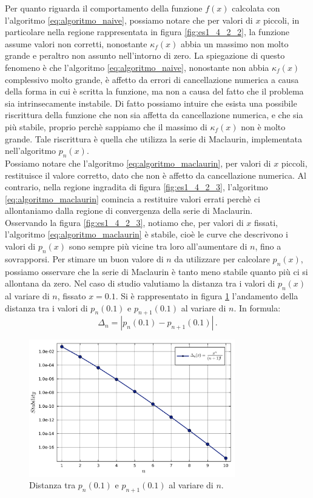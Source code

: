 \documentclass[letterpaper, 12pt]{article}
\begin{document}
Per quanto riguarda il comportamento della funzione $f(x)$ calcolata con l'algoritmo \ref{eq:algoritmo_naive},
possiamo notare che per valori di $x$ piccoli, in particolare nella regione rappresentata in figura 
\ref{fig:es1_4_2_2}, la funzione assume valori non corretti, nonostante $\kappa_f(x)$ abbia un massimo non molto
grande e peraltro non assunto nell'intorno di zero. La spiegazione di questo fenomeno è che l'algoritmo
\ref{eq:algoritmo_naive}, nonostante non abbia $\kappa_f(x)$ complessivo molto grande, è affetto da errori 
di cancellazione numerica a causa della forma in cui è scritta la funzione, ma non a causa del fatto che 
il problema sia intrinsecamente instabile. Di fatto possiamo intuire che esista una possibile riscrittura
della funzione che non sia affetta da cancellazione numerica, e che sia più stabile, proprio perchè 
sappiamo che il massimo di $\kappa_f(x)$ non è molto grande. Tale riscrittura è quella che utilizza la
serie di Maclaurin, implementata nell'algoritmo $p_n(x)$. \\
Possiamo notare che l'algoritmo \ref{eq:algoritmo_maclaurin}, per valori di $x$ piccoli, restituisce il 
valore corretto, dato che non è affetto da cancellazione numerica. Al contrario, nella regione ingradita di 
figura \ref{fig:es1_4_2_3}, l'algoritmo \ref{eq:algoritmo_maclaurin} comincia a restituire valori errati
perchè ci allontaniamo dalla regione di convergenza della serie di Maclaurin. \\
Osservando la figura \ref{fig:es1_4_2_3}, notiamo che, per valori di $x$ fissati, l'algoritmo 
\ref{eq:algoritmo_maclaurin} è stabile, cioè le curve che descrivono i valori di $p_n(x)$ sono sempre più 
vicine tra loro all'aumentare di $n$, fino a sovrapporsi. Per stimare un buon valore di $n$ da utilizzare
per calcolare $p_n(x)$, possiamo osservare che la serie di Maclaurin è tanto meno stabile quanto più ci si
allontana da zero. Nel caso di studio valutiamo la distanza tra i valori di $p_n(x)$ al variare di $n$,
fissato $x = 0.1$. Si è rappresentato in figura \ref{fig:es1_4_2_4} l'andamento della distanza tra i valori
di $p_n(0.1)$ e $p_{n+1}(0.1)$ al variare di $n$. In formula:
\begin{equation}
    \Delta_n = |p_n(0.1) - p_{n+1}(0.1)|\,.
\end{equation}
\begin{figure}[!ht]
    \centering
    \includegraphics[width=0.8\textwidth]{1424.pdf}
    \caption{Distanza tra $p_n(0.1)$ e $p_{n+1}(0.1)$ al variare di $n$.}
    \label{fig:es1_4_2_4}
\end{figure}
\end{document}
